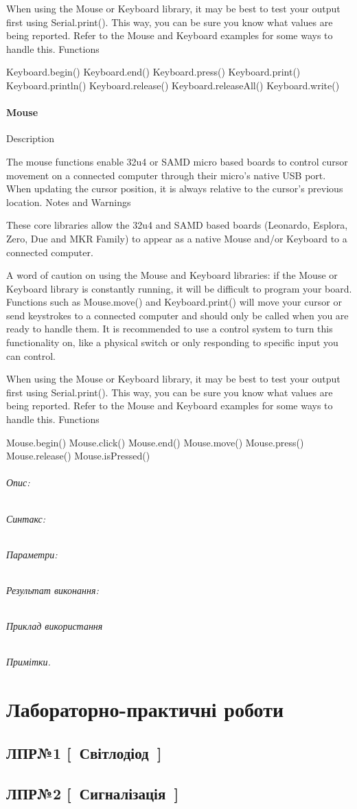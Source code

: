 \documentclass[12pt,a4paper]{report}  %
\begin{document}
When using the Mouse or Keyboard library, it may be best to test your output first using Serial.print(). This way, you can be sure you know what values are being reported. Refer to the Mouse and Keyboard examples for some ways to handle this.
Functions

Keyboard.begin()
Keyboard.end()
Keyboard.press()
Keyboard.print()
Keyboard.println()
Keyboard.release()
Keyboard.releaseAll()
Keyboard.write()
	
\subsubsection{Mouse}\label{Mouse} 

Description

The mouse functions enable 32u4 or SAMD micro based boards to control cursor movement on a connected computer through their micro’s native USB port. When updating the cursor position, it is always relative to the cursor’s previous location.
Notes and Warnings

These core libraries allow the 32u4 and SAMD based boards (Leonardo, Esplora, Zero, Due and MKR Family) to appear as a native Mouse and/or Keyboard to a connected computer.

A word of caution on using the Mouse and Keyboard libraries: if the Mouse or Keyboard library is constantly running, it will be difficult to program your board. Functions such as Mouse.move() and Keyboard.print() will move your cursor or send keystrokes to a connected computer and should only be called when you are ready to handle them. It is recommended to use a control system to turn this functionality on, like a physical switch or only responding to specific input you can control.

When using the Mouse or Keyboard library, it may be best to test your output first using Serial.print(). This way, you can be sure you know what values are being reported. Refer to the Mouse and Keyboard examples for some ways to handle this.
Functions

Mouse.begin()
Mouse.click()
Mouse.end()
Mouse.move()
Mouse.press()
Mouse.release()
Mouse.isPressed()

\subparagraph{Опис:}
\subparagraph{Синтакс:}
\subparagraph{Параметри:}
\subparagraph{Результат виконання:}
\subparagraph{Приклад використання}
\subparagraph{Примітки.}


\chapter{Лабораторно-практичні роботи}

\section*{ЛПР№1 [~Світлодіод~]}
\section*{ЛПР№2 [~Сигналізація~]}
\end{document}
